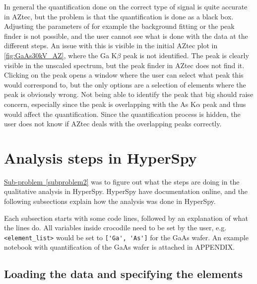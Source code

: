 In general the quantification done on the correct type of signal is quite accurate in AZtec, but the problem is that the quantification is done as a black box.
Adjusting the parameters of for example the background fitting or the peak finder is not possible, and the user cannot see what is done with the data at the different steps.
An issue with this is visible in the initial AZtec plot in \cref{fig:GaAs30kV_AZ}, where the Ga K$\beta$ peak is not identified.
The peak is clearly visible in the unscaled spectrum, but the peak finder in AZtec does not find it.
Clicking on the peak opens a window where the user can select what peak this would correspond to, but the only options are a selection of elements where the peak is obviously wrong.
Not being able to identify the peak that big should raise concern, especially since the peak is overlapping with the As K$\alpha$ peak and thus would affect the quantification.
Since the quantification process is hidden, the user does not know if AZtec deals with the overlapping peaks correctly.









%
%
\section{Analysis steps in HyperSpy}
\label{sec:discussion:steps}

\hyperref[subproblem2]{Sub-problem~\ref*{subproblem2}} was to figure out what the steps are doing in the qualitative analysis in HyperSpy.
HyperSpy have documentation online, and the following subsections explain how the analysis was done in HyperSpy.


Each subsection starts with some code lines, followed by an explanation of what the lines do.
All variables inside crocodile need to be set by the user, e.g. \verb|<element_list>| would be set to \verb|['Ga', 'As']| for the GaAs wafer.
An example notebook with quantification of the GaAs wafer is attached in APPENDIX.







\subsection{Loading the data and specifying the elements}
\label{sec:discussion:steps:load}

